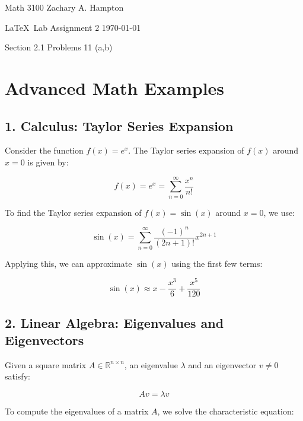 \newcommand{\R}{\mathbb{R}} %
\newcommand{\Q}{\mathbb{Q}} %
\newcommand{\N}{\mathbb{N}} %
\newcommand{\Z}{\mathbb{Z}} %
\newcommand{\eps}{\varepsilon} %

\newcommand{\solution}{\textcolor{PineGreen}{Solution:\newline}}




Math 3100 \hfill Zachary A. Hampton

\LaTeX~Lab Assignment 2 \hfill 
\today

\bigskip

Section 2.1 Problems 11 (a,b)

\section*{Advanced Math Examples}

\subsection*{1. Calculus: Taylor Series Expansion}

Consider the function $f(x) = e^x$. The Taylor series expansion of $f(x)$ around $x = 0$ is given by:

\[
f(x) = e^x = \sum_{n=0}^{\infty} \frac{x^n}{n!}
\]

To find the Taylor series expansion of $f(x) = \sin(x)$ around $x = 0$, we use:

\[
\sin(x) = \sum_{n=0}^{\infty} \frac{(-1)^n}{(2n+1)!} x^{2n+1}
\]

Applying this, we can approximate $\sin(x)$ using the first few terms:

\[
\sin(x) \approx x - \frac{x^3}{6} + \frac{x^5}{120}
\]

\subsection*{2. Linear Algebra: Eigenvalues and Eigenvectors}

Given a square matrix $A \in \mathbb{R}^{n \times n}$, an eigenvalue $\lambda$ and an eigenvector $v \neq 0$ satisfy:

\[
A v = \lambda v
\]

To compute the eigenvalues of a matrix $A$, we solve the characteristic equation:

